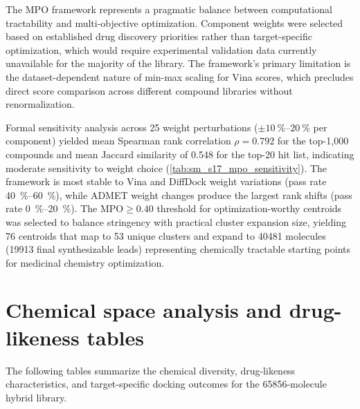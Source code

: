 \documentclass[journal=jcisd8,manuscript=suppinfo]{achemso}
\begin{document}
The MPO framework represents a pragmatic balance between computational tractability and multi-objective optimization. Component weights were selected based on established drug discovery priorities \cite{Hughes2008, Lipinski2004} rather than target-specific optimization, which would require experimental validation data currently unavailable for the majority of the library. The framework's primary limitation is the dataset-dependent nature of min-max scaling for Vina scores, which precludes direct score comparison across different compound libraries without renormalization.

Formal sensitivity analysis across \num{25} weight perturbations ($\pm \qtyrange{10}{20}{\percent}$ per component) yielded mean Spearman rank correlation $\rho = \num{0.792}$ for the top-1,000 compounds and mean Jaccard similarity of \num{0.548} for the top-20 hit list, indicating moderate sensitivity to weight choice (\cref{tab:sm_s17_mpo_sensitivity}). The framework is most stable to Vina and DiffDock weight variations (pass rate \qtyrange{40}{60}{\percent}), while ADMET weight changes produce the largest rank shifts (pass rate \qtyrange{0}{20}{\percent}). The $\text{MPO} \geq \num{0.40}$ threshold for optimization-worthy centroids was selected to balance stringency with practical cluster expansion size, yielding \num{76} centroids that map to \num{53} unique clusters and expand to \num{40481} molecules (\num{19913} final synthesizable leads) representing chemically tractable starting points for medicinal chemistry optimization.

\clearpage

\section*{Chemical space analysis and drug-likeness tables}

The following tables summarize the chemical diversity, drug-likeness characteristics, and target-specific docking outcomes for the \num{65856}-molecule hybrid library.
\end{document}
